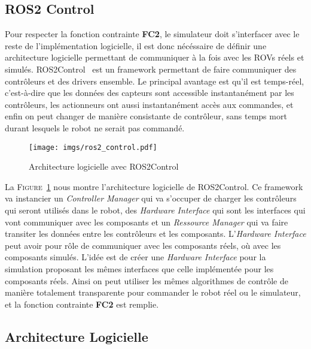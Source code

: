         \subsection{ROS2 Control}

            Pour respecter la fonction contrainte \textbf{FC2}, le simulateur doit s'interfacer avec le reste de l'implémentation logicielle, il est donc nécéssaire de définir une architecture logicielle permettant de communiquer à la fois avec les \gls{ROV}s réels et simulés. \gls{ROS2Control}~\cite{ros_control} est un framework permettant de faire communiquer des contrôleurs et des drivers ensemble. Le principal avantage est qu'il est temps-réel, c'est-à-dire que les données des capteurs sont accessible instantanément par les contrôleurs, les actionneurs ont aussi instantanément accès aux commandes, et enfin on peut changer de manière consistante de contrôleur, sans temps mort durant lesquels le robot ne serait pas commandé.

            \begin{figure}[!htb]
                \centering
                \texttt{[image: imgs/ros2\_control.pdf]}
                \caption{Architecture logicielle avec \gls{ROS2Control}}
                \label{fig:ros2_control}
            \end{figure}

            La \textsc{Figure}~\ref{fig:ros2_control} nous montre l'architecture logicielle de \gls{ROS2Control}. Ce framework va instancier un \textit{Controller Manager} qui va s'occuper de charger les contrôleurs qui seront utilisés dans le robot, des \textit{Hardware Interface} qui sont les interfaces qui vont communiquer avec les composants et un \textit{Ressource Manager} qui va faire transiter les données entre les contrôleurs et les composants. L'\textit{Hardware Interface} peut avoir pour rôle de communiquer avec les composants réels, où avec les composants simulés. L'idée est de créer une \textit{Hardware Interface} pour la simulation proposant les mêmes interfaces que celle implémentée pour les composants réels. Ainsi on peut utiliser les mêmes algorithmes de contrôle de manière totalement transparente pour commander le robot réel ou le simulateur, et la fonction contrainte \textbf{FC2} est remplie.

        \subsection{Architecture Logicielle}

